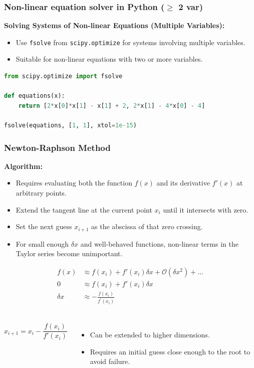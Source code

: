 \begin{frame}[fragile]
  \frametitle{Non-linear equation solver in Python ($\geq$ 2 var)}

  \textbf{Solving Systems of Non-linear Equations (Multiple Variables):}
  \begin{itemize}
      \item Use \texttt{fsolve} from \texttt{scipy.optimize} for systems involving multiple variables.
      \item Suitable for non-linear equations with two or more variables.
  \end{itemize}
  \begin{lstlisting}[language=Python]
from scipy.optimize import fsolve

def equations(x):
    return [2*x[0]*x[1] - x[1] + 2, 2*x[1] - 4*x[0] - 4]

fsolve(equations, [1, 1], xtol=1e-15)
    \end{lstlisting}
\end{frame}


\begin{frame}[fragile]
    \frametitle{Newton-Raphson Method}

    \textbf{Algorithm:}
    \begin{itemize}
        \item Requires evaluating both the function \( f(x) \) and its derivative \( f'(x) \) at arbitrary points.
        \item Extend the tangent line at the current point \( x_i \) until it intersects with zero.
        \item Set the next guess \( x_{i+1} \) as the abscissa of that zero crossing.
        \item For small enough \( \delta x \) and well-behaved functions, non-linear terms in the Taylor series become unimportant.
    \end{itemize}
    \vspace{-0.10cm}
    \begin{align*}
    f(x) &\approx f(x_i) + f'(x_i)\delta x + \mathcal{O}(\delta x^2) + \dots \\
    0 &\approx f(x_i) + f'(x_i)\delta x \\
    \delta x &\approx -\frac{f(x_i)}{f^\prime (x_i)} \\
    \end{align*}

    \vspace{-1.2cm}
    \begin{columns}
    \[
      \boxed{x_{i+1} = x_i - \frac{f(x_i)}{f'(x_i)}}
      \]   
    \begin{itemize}
        \item Can be extended to higher dimensions.
        \item Requires an initial guess close enough to the root to avoid failure.
    \end{itemize}
  \end{columns}
    
\end{frame}

